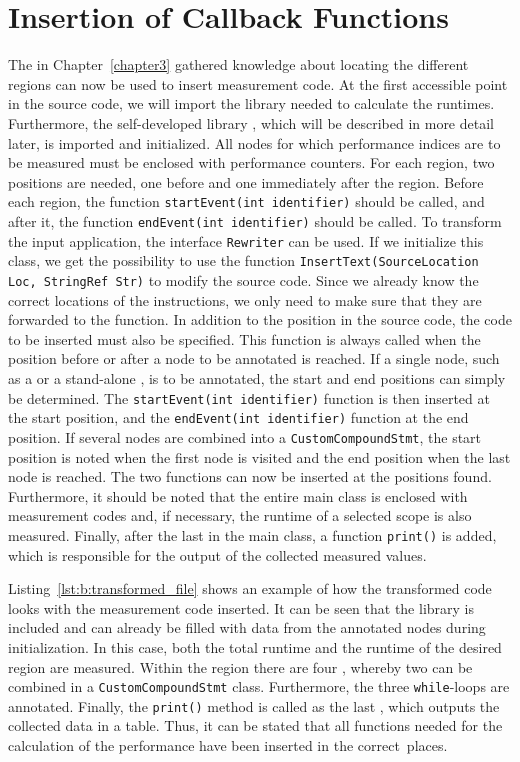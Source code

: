 \section{Insertion of Callback Functions}
The in Chapter~\ref{chapter3} gathered knowledge about locating the different regions can now be used to insert measurement code. At the first accessible point in the source code, we will import the library needed to calculate the runtimes. Furthermore, the self-developed library \DATA, which will be described in more detail later, is imported and initialized. All nodes for which performance indices are to be measured must be enclosed with performance counters. For each region, two positions are needed, one before and one immediately after the region. Before each region, the function \lstinline{startEvent(int identifier)} should be called, and after it, the function \lstinline{endEvent(int identifier)} should be called. To transform the input application, the interface \lstinline{Rewriter} can be used. If we initialize this class, we get the possibility to use the function \lstinline{InsertText(SourceLocation Loc, StringRef Str)} to modify the source code. Since we already know the correct locations of the instructions, we only need to make sure that they are forwarded to the function. In addition to the position in the source code, the code to be inserted must also be specified. This function is always called when the position before or after a node to be annotated is reached. If a single node, such as a \PARSTA or a stand-alone \LEASTA, is to be annotated, the start and end positions can simply be determined. The \lstinline{startEvent(int identifier)} function is then inserted at the start position, and the \lstinline{endEvent(int identifier)} function at the end position. If several nodes are combined into a \lstinline{CustomCompoundStmt}, the start position is noted when the first node is visited and the end position when the last node is reached. The two functions can now be inserted at the positions found. Furthermore, it should be noted that the entire main class is enclosed with measurement codes and, if necessary, the runtime of a selected scope is also measured. Finally, after the last \STAT in the main class, a function \lstinline{print()} is added, which is responsible for the output of the collected measured values. 

Listing~\ref{lst:b:transformed_file} shows an example of how the transformed code looks with the measurement code inserted. It can be seen that the \DATA library is included and can already be filled with data from the annotated nodes during initialization. In this case, both the total runtime and the runtime of the desired region are measured. Within the region there are four \LEASTAS, whereby two can be combined in a \lstinline{CustomCompoundStmt} class. Furthermore, the three \lstinline{while}-loops are annotated. Finally, the \lstinline{print()} method is called as the last \STAT, which outputs the collected data in a table. Thus, it can be stated that all functions needed for the calculation of the performance have been inserted in the correct~places.

